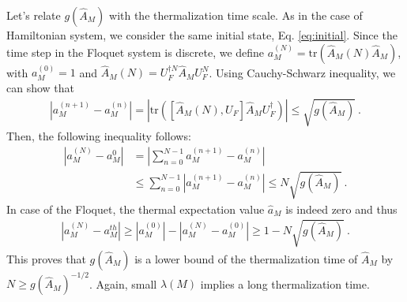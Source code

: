 \documentclass[twocolumn,superscriptaddress, prb]{revtex4-1}
\begin{document}
Let's relate $g(\hat{A}_M) $ with the thermalization time scale.
As in the case of Hamiltonian system, we consider the same initial state, Eq. \eqref{eq:initial}.
Since the time step in the Floquet system is discrete, we define $a_M^{(N)} = \mathrm{tr}(\hat{A}_M(N)\hat{A}_M )$, with
$a_M^{(0)} = 1$ and $\hat{A}_M(N) = U_F^{\dag N}\hat{A}_M U_F^N$. Using Cauchy-Schwarz inequality, we can show that
\begin{align}
|a_M^{(n+1)} - a_M^{(n)}| = |\mathrm{tr}([\hat{A}_M(N),U_F]\hat{A}_M U_F^{\dag})| \leq \sqrt{g(\hat{A}_M) } ~.
\end{align}
Then, the following inequality follows:
\begin{align}
|a_M^{(N)} - a_M^{0}| &= \left|\sum_{n=0}^{N-1}a_M^{(n+1)} - a_M^{(n)}\right| \nonumber\\
&\leq \sum_{n = 0}^{N-1}|a_M^{(n+1)} - a_M^{(n)}| \leq N \sqrt{g(\hat{A}_M) } ~.
\end{align}
In case of the Floquet, the thermal expectation value $\hat{a}_M$ is indeed zero and thus
\begin{align}
|a_M^{(N)} - a_M^{th}| \geq |a_M^{(0)}| - |a_M^{(N)} - a_M^{(0)}| \geq 1 - N \sqrt{g(\hat{A}_M) } ~.
\label{eq:floquet_timescale}
\end{align}
This proves that $g(\hat{A}_M)$ is a lower bound of the thermalization time of $\hat{A}_M$ by
$N \geq g(\hat{A}_M) ^{-1/2}$. Again, small $\lambda(M)$ implies a long thermalization time.

\end{document}

